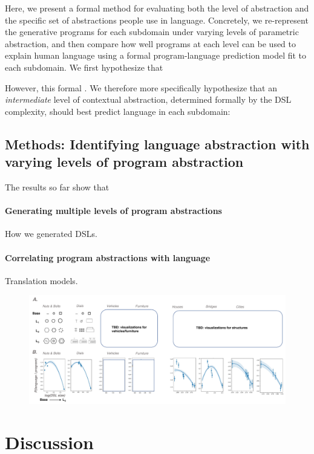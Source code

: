 \documentclass[10pt,letterpaper]{article}
\begin{document}
Here, we present a formal method for evaluating both the level of abstraction and the specific set of abstractions people use in language. Concretely, we re-represent the generative programs for each subdomain under varying levels of parametric abstraction, and then compare how well programs at each level can be used to explain human language using a formal program-language prediction model fit to each subdomain. We first hypothesize that 

However, this formal . We therefore more specifically hypothesize that an \textit{intermediate} level of contextual abstraction, determined formally by the DSL complexity, should best predict language in each subdomain: 


\subsection{Methods: Identifying language abstraction with varying levels of program abstraction}
The results so far show that 

\paragraph{Generating multiple levels of program abstractions} How we generated DSLs.
\paragraph{Correlating program abstractions with language} Translation models.

\begin{figure}
  \begin{center}
  \includegraphics[width=0.99\linewidth]{figures/fig_language_libraries.pdf}
  \caption{}
  \label{fig:lanuage_libraries}
  \end{center}
  \end{figure}
  



\section{Discussion}
\end{document}
